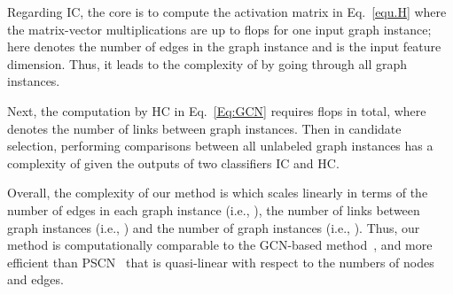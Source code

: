 \documentclass[sigconf]{acmart}
\begin{document}
Regarding IC, the core is to compute the activation matrix  in Eq.~\eqref{equ.H} where the matrix-vector multiplications are up to  flops for one input graph instance; here  denotes the number of edges in the graph instance and  is the input feature dimension.  Thus, it leads to the complexity of  by going through all  graph instances.

Next, the computation by HC in Eq.~\eqref{Eq:GCN} requires  flops in total, where  denotes the number of links between graph instances.  Then in candidate selection, performing comparisons between all unlabeled graph instances has a complexity of  given the outputs of two classifiers IC and HC.

Overall, the complexity of our method is  which scales linearly in terms of the number of edges in each graph instance (i.e., ), the number of links between graph instances (i.e., ) and the number of graph instances (i.e., ).  Thus, our method is computationally comparable to the GCN-based method~\cite{kipf2017semi}, and more efficient than PSCN~\cite{Niepert2016LearningCN} that is quasi-linear with respect to the numbers of nodes and edges.
\end{document}
